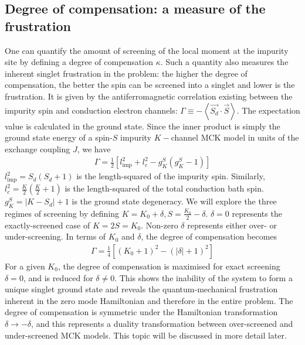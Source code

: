 \documentclass[reprint,prb,superscriptaddress]{revtex4-2}
\begin{document}
\subsection{Degree of compensation: a measure of the frustration}
\label{sec:deg_of_comp}
One can quantify the amount of screening of the local moment at the impurity site by defining a degree of compensation \(\kappa\). Such a quantity also measures the inherent singlet frustration in the problem: the higher the degree of compensation, the better the spin can be screened into a singlet and lower is the frustration. It is given by the antiferromagnetic correlation existing between the impurity spin and conduction electron channels: $\Gamma \equiv - \left< \vec{S_d}\cdot \vec{S}\right>$.
The expectation value is calculated in the ground state. Since the inner product is simply the ground state energy of a spin-\(S\) impurity \(K-\)channel MCK model in units of the exchange coupling \(J\), we have
\begin{equation}\begin{aligned}
	\Gamma = \frac{1}{2} \left[ l_\text{imp}^2 + l_c^2 - g^S_K\left( g^S_K - 1 \right)\right]
\end{aligned}\end{equation}
\(l_\text{imp}^2 = S_d(S_d+1)\) is the length-squared of the impurity spin. Similarly, \(l_c^2 = \frac{K}{2}\left(\frac{K}{2} + 1\right) \) is the length-squared of the total conduction bath spin. \(g^S_K = |K - S_d| + 1\) is the ground state degeneracy. We will explore the three regimes of screening by defining \(K = K_0 + \delta, S = \frac{K_0}{2} - \delta\). \(\delta=0\) represents the exactly-screened case of \(K = 2S = K_0\). Non-zero \(\delta\) represents either over- or under-screening. In terms of \(K_0\) and \(\delta\), the degree of compensation becomes
\begin{equation}\begin{aligned}
	\label{gamma}
	\Gamma = \frac{1}{4}\left[\left( K_0 + 1 \right) ^2 - \left(|\delta| + 1 \right) ^2\right] 
\end{aligned}\end{equation}
{For a given \(K_0\), the degree of compensation is maximised for exact screening \(\delta=0\), and is reduced for \(\delta \neq 0\). This shows the inability of the system to form a unique singlet ground state and reveals the quantum-mechanical frustration inherent in the zero mode Hamiltonian and therefore in the entire problem.} The degree of compensation is symmetric under the Hamiltonian transformation \(\delta \to -\delta\), and this represents a duality transformation between over-screened and under-screened MCK models. This topic will be discussed in more detail later.
\end{document}
